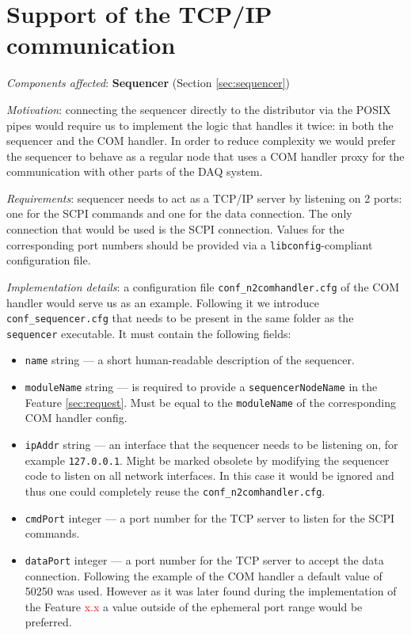 \section{Support of the TCP/IP communication}
\label{sec:tcp_ip_sequencer}

\textit{Components affected}: \textbf{Sequencer} (Section \ref{sec:sequencer})

\textit{Motivation}: connecting the sequencer directly to the distributor via the POSIX pipes would require us to implement the logic that handles it twice: in both the sequencer and the COM handler. In order to reduce complexity we would prefer the sequencer to behave as a regular node that uses a COM handler proxy for the communication with other parts of the DAQ system.

\textit{Requirements}: sequencer needs to act as a TCP/IP server by listening on 2 ports: one for the SCPI commands and one for the data connection. The only connection that would be used is the SCPI connection. Values for the corresponding port numbers should be provided via a \texttt{libconfig}-compliant configuration file.

\textit{Implementation details}: a configuration file \texttt{conf\_n2comhandler.cfg} of the COM handler would serve us as an example. Following it we introduce \texttt{conf\_sequencer.cfg} that needs to be present in the same folder as the \texttt{sequencer} executable. It must contain the following fields:

\begin{itemize}
	\item \texttt{name} string --- a short human-readable description of the sequencer.
	\item \texttt{moduleName} string --- is required to provide a \texttt{sequencerNodeName} in the Feature \ref{sec:request}. Must be equal to the \texttt{moduleName} of the corresponding COM handler config.
	\item \texttt{ipAddr} string --- an interface that the sequencer needs to be listening on, for example \texttt{127.0.0.1}. Might be marked obsolete by modifying the sequencer code to listen on all network interfaces. In this case it would be ignored and thus one could completely reuse the \texttt{conf\_n2comhandler.cfg}.
	\item \texttt{cmdPort} integer --- a port number for the TCP server to listen for the SCPI commands.
	\item \texttt{dataPort} integer --- a port number for the TCP server to accept the data connection. Following the example of the COM handler a default value of 50250 was used. However as it was later found during the implementation of the Feature \textcolor{red}{x.x} a value outside of the ephemeral port range would be preferred.
\end{itemize}

